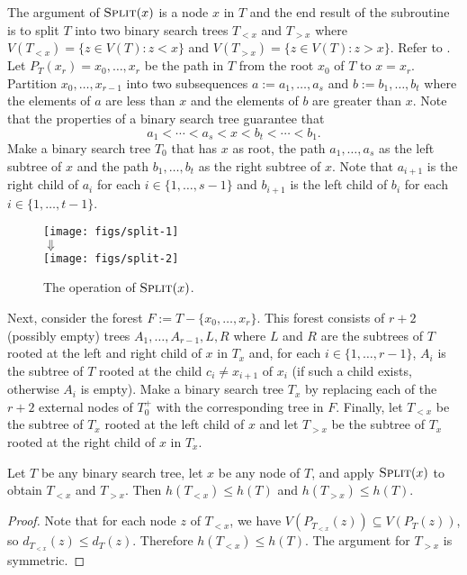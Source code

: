 \documentclass[kpfonts]{patmorin}
\let\le\leqslant
\begin{document}
The argument of $\textsc{Split}(x)$ is a node $x$ in $T$ and the end result of the subroutine is to split $T$ into two binary search trees $T_{<x}$ and $T_{>x}$ where $V(T_{<x})=\{z\in V(T): z<x\}$ and $V(T_{>x})=\{z\in V(T): z>x\}$. Refer to .  Let $P_T(x_r)=x_0,\dots,x_r$ be the path in $T$ from the root $x_0$ of $T$ to $x=x_r$.  Partition $x_0,\dots,x_{r-1}$ into two subsequences $a:=a_1,\dots,a_s$ and $b:=b_1,\dots,b_t$ where the elements of $a$ are less than $x$ and the elements of $b$ are greater than $x$.
Note that the properties of a binary search tree guarantee that
\[
a_1 < \cdots < a_s < x < b_t < \cdots < b_1.
\]
Make a binary search tree $T_0$ that has $x$ as root, the path $a_1,\dots,a_s$ as the left subtree of $x$ and the path $b_1,\dots,b_t$ as the right subtree of $x$.  Note that $a_{i+1}$ is the right child of $a_i$ for each $i\in\{1,\dots,s-1\}$ and $b_{i+1}$ is the left child of $b_i$ for each $i\in\{1,\dots,t-1\}$.

\begin{figure}
  \begin{center}
    \texttt{[image: figs/split-1]} \\[1ex]
    $\Downarrow$ \\[1ex]
    \texttt{[image: figs/split-2]}
  \end{center}
  \caption{The operation of $\textsc{Split}(x)$.}
\end{figure}

Next, consider the forest $F:=T-\{x_0,\dots,x_r\}$. This forest consists of $r+2$ (possibly empty) trees $A_1,\dots,A_{r-1},L,R$ where $L$ and $R$ are the subtrees of $T$ rooted at the left and right child of $x$ in $T_x$ and, for each $i\in\{1,\dots,r-1\}$, $A_i$ is the subtree of $T$ rooted at the child $c_i\neq x_{i+1}$ of $x_i$ (if such a child exists, otherwise $A_i$ is empty).  Make a binary search tree $T_x$ by replacing each of the $r+2$ external nodes of $T_0^+$ with the corresponding tree in $F$.  Finally, let $T_{<x}$ be the subtree of $T_x$ rooted at the left child of $x$ and let $T_{>x}$ be the subtree of $T_x$ rooted at the right child of $x$ in $T_x$.

\begin{lem}
  Let $T$ be any binary search tree, let $x$ be any node of $T$, and apply $\textsc{Split}(x)$ to obtain $T_{<x}$ and $T_{>x}$.
  Then $h(T_{<x})\le h(T)$ and $h(T_{>x})\le h(T)$.
\end{lem}

\begin{proof}
  Note that for each node $z$ of $T_{<x}$, we have $V(P_{T_{<x}}(z))\subseteq V(P_T(z))$,
  so $d_{T_{<x}}(z)\le d_T(z)$.
  Therefore $h(T_{<x})\le h(T)$. The argument for $T_{>x}$ is symmetric.
\end{proof}
\end{document}
